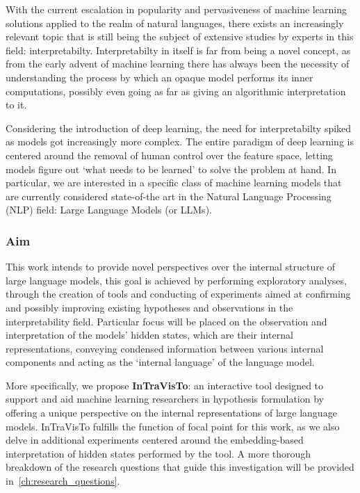 With the current escalation in popularity and pervasiveness of machine learning solutions applied to the realm of natural languages, there exists an increasingly relevant topic that is still being the subject of extensive studies by experts in this field: interpretabilty.
Interpretabilty in itself is far from being a novel concept, as from the early advent of machine learning there has always been the necessity of understanding the process by which an opaque model performs its inner computations, possibly even going as far as giving an algorithmic interpretation to it.

Considering the introduction of deep learning, the need for interpretabilty spiked as models got increasingly more complex.
The entire paradigm of deep learning is centered around the removal of human control over the feature space, letting models figure out `what needs to be learned' to solve the problem at hand.
In particular, we are interested in a specific class of machine learning models that are currently considered state-of-the art in the Natural Language Processing (NLP) field: Large Language Models (or LLMs).

\subsubsection*{Aim}

This work intends to provide novel perspectives over the internal structure of large language models, this goal is achieved by performing exploratory analyses, through the creation of tools and conducting of experiments aimed at confirming and possibly improving existing hypotheses and observations in the interpretability field.
Particular focus will be placed on the observation and interpretation of the models' hidden states, which are their internal representations, conveying condensed information between various internal components and acting as the `internal language' of the language model.

More specifically, we propose \textbf{InTraVisTo}: an interactive tool designed to support and aid machine learning researchers in hypothesis formulation by offering a unique perspective on the internal representations of large language models.
InTraVisTo fulfills the function of focal point for this work, as we also delve in additional experiments centered around the embedding-based interpretation of hidden states performed by the tool.
A more thorough breakdown of the research questions that guide this investigation will be provided in~\cref{ch:research_questions}.


